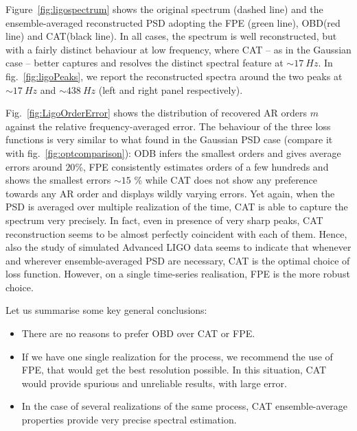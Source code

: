 \documentclass[twocolumn,showpacs,preprintnumbers,nofootinbib,prd,
superscriptaddress,10pt]{revtex4-1}
\begin{document}
Figure~\ref{fig:ligospectrum} shows the original spectrum (dashed line) and the ensemble-averaged reconstructed PSD adopting the FPE (green line), OBD(red line) and CAT(black line).
In all cases, the spectrum is well reconstructed, but with a fairly distinct behaviour at low frequency, where CAT -- as in the Gaussian case -- better captures and resolves the distinct spectral feature at $\sim \SI{17}{Hz}$.
In fig.~\ref{fig:ligoPeaks}, we report the reconstructed spectra around the two peaks at $\sim \SI{17}{Hz}$ and $\sim \SI{438}{Hz}$ (left and right panel respectively).

Fig.~\ref{fig:LigoOrderError} shows the distribution of recovered AR orders $m$ against the relative frequency-averaged error. The behaviour
of the three loss functions is very similar to what found in the Gaussian PSD case (compare it with fig.~\ref{fig:optcomparison}): ODB infers the smallest orders and gives average errors around $20$\%, FPE consistently estimates orders of a few hundreds and shows the smallest errors $\sim 15$ \% while CAT does not show any preference towards any AR order and displays wildly varying errors. Yet again, when the PSD is averaged over multiple realization of the time, CAT is able to capture the spectrum very precisely. In fact, even in presence of very sharp peaks, CAT reconstruction seems to be almost perfectly coincident with each of them.
Hence, also the study of simulated Advanced LIGO data seems to indicate that whenever and wherever ensemble-averaged PSD are necessary, CAT is the optimal choice of loss function. However, on a single time-series realisation, FPE is the more robust choice.

Let us summarise some key general conclusions:
\begin{itemize}
	\item There are no reasons to prefer OBD over CAT or FPE.
	\item If we have one single realization for the process, we recommend the use of FPE, that would get the best resolution possible. In this situation, CAT would provide spurious and unreliable results, with large error.
	\item In the case of several realizations of the same process, CAT ensemble-average properties provide very precise spectral estimation.\end{itemize}
\end{document}

